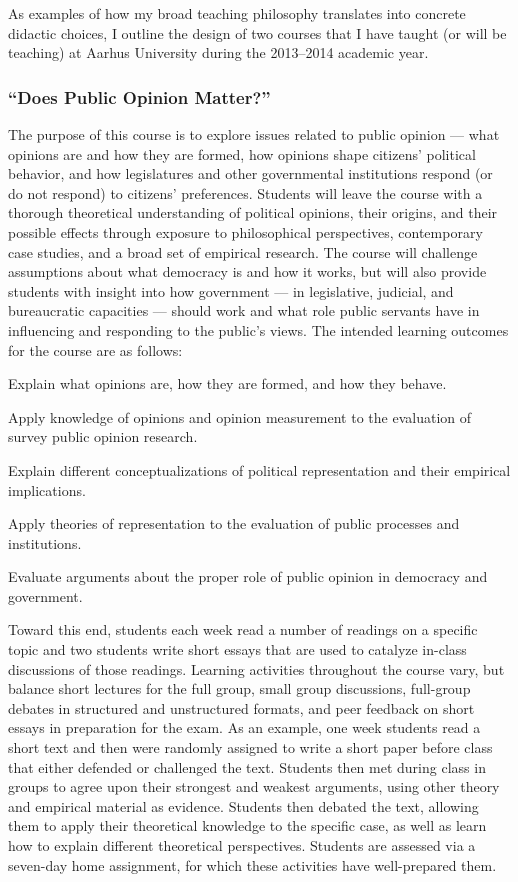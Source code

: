 \documentclass[12pt]{article}
\begin{document}
As examples of how my broad teaching philosophy translates into concrete didactic choices, I outline the design of two courses that I have taught (or will be teaching) at Aarhus University during the 2013--2014 academic year. 

\subsubsection{``Does Public Opinion Matter?''}

The purpose of this course is to explore issues related to public opinion --- what opinions are and how they are formed, how opinions shape citizens' political behavior, and how legislatures and other governmental institutions respond (or do not respond) to citizens' preferences. Students will leave the course with a thorough theoretical understanding of political opinions, their origins, and their possible effects through exposure to philosophical perspectives, contemporary case studies, and a broad set of empirical research. The course will challenge assumptions about what democracy is and how it works, but will also provide students with insight into how government --- in legislative, judicial, and bureaucratic capacities --- should work and what role public servants have in influencing and responding to the public's views. The intended learning outcomes for the course are as follows:

\begin{enumerate*}
\item Explain what opinions are, how they are formed, and how they behave.
\item Apply knowledge of opinions and opinion measurement to the evaluation of survey public opinion research.
\item Explain different conceptualizations of political representation and their empirical implications.
\item Apply theories of representation to the evaluation of public processes and institutions.
\item Evaluate arguments about the proper role of public opinion in democracy and government.
\end{enumerate*}

Toward this end, students each week read a number of readings on a specific topic and two students write short essays that are used to catalyze in-class discussions of those readings. Learning activities throughout the course vary, but balance short lectures for the full group, small group discussions, full-group debates in structured and unstructured formats, and peer feedback on short essays in preparation for the exam. As an example, one week students read a short text and then were randomly assigned to write a short paper before class that either defended or challenged the text. Students then met during class in groups to agree upon their strongest and weakest arguments, using other theory and empirical material as evidence. Students then debated the text, allowing them to apply their theoretical knowledge to the specific case, as well as learn how to explain different theoretical perspectives. Students are assessed via a seven-day home assignment, for which these activities have well-prepared them.
\end{document}
